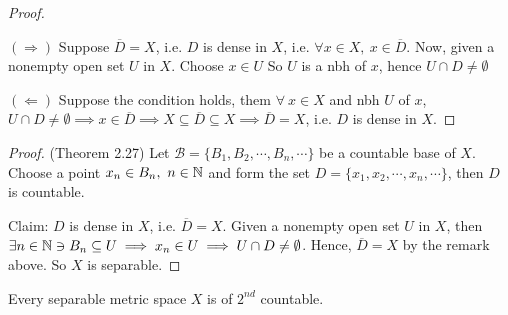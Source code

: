 \begin{proof}$ $

$(\Rightarrow)$ Suppose $\overline{D} = X$, i.e. $D$ is dense in $X$, i.e. $\forall x \in X,~x \in \overline{D}$. Now, given a nonempty open set $U$ in $X$. Choose $x \in U$ So $U$ is a nbh of $x$, hence $U \cap D \neq \emptyset$

$(\Leftarrow)$ Suppose the condition holds, them $\forall~x \in X$ and nbh $U$ of $x$, $U \cap D \neq \emptyset \implies x \in \overline{D} \implies X \subseteq \overline{D} \subseteq X \implies \overline{D} = X$, i.e. $D$ is dense in $X$.
\end{proof}


\begin{proof}(Theorem 2.27)
	Let $\mathscr B = \{B_1,B_2,\cdots,B_n,\cdots\}$ be a countable base of $X$. Choose a point $x_n \in B_n,~n \in \mathbb{N}$ and form the set $D = \{x_1,x_2,\cdots,x_n,\cdots\}$, then $D$ is countable.
	
	Claim: $D$ is dense in $X$, i.e. $\overline{D} = X$. Given a nonempty open set $U$ in $X$, then $\exists n \in \mathbb{N} \ni B_n \subseteq U \implies x_n \in U \implies U \cap D \neq \emptyset$. Hence, $\overline{D} = X$ by the remark above. So $X$ is separable.
\end{proof}

\begin{thm}
	Every separable metric space $X$ is of $2^{nd}$ countable.
\end{thm}


